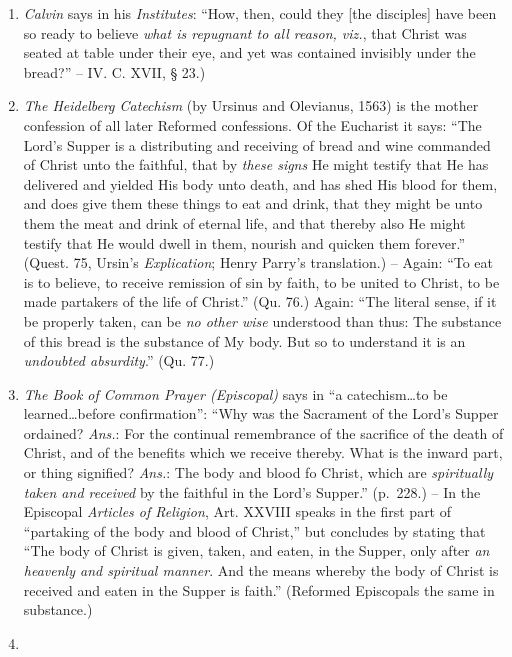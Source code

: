 \documentclass[
]{book}
\begin{document}
\begin{enumerate}
\def\labelenumi{\arabic{enumi}.}
\setcounter{enumi}{1}
\item
  \emph{Calvin} says in his \emph{Institutes}: ``How, then, could they {[}the disciples{]} have been so ready to believe \emph{what is repugnant to all reason, viz.}, that Christ was seated at table under their eye, and yet was contained invisibly under the bread?'' -- IV. C. XVII, § 23.)
\item
  \emph{The Heidelberg Catechism} (by Ursinus and Olevianus, 1563) is the mother confession of all later Reformed confessions. Of the Eucharist it says: ``The Lord's Supper is a distributing and receiving of bread and wine commanded of Christ unto the faithful, that by \emph{these signs} He might testify that He has delivered and yielded His body unto death, and has shed His blood for them, and does give them these things to eat and drink, that they might be unto them the meat and drink of eternal life, and that thereby also He might testify that He would dwell in them, nourish and quicken them forever.'' (Quest. 75, Ursin's \emph{Explication}; Henry Parry's translation.) -- Again: ``To eat is to believe, to receive remission of sin by faith, to be united to Christ, to be made partakers of the life of Christ.'' (Qu. 76.) Again: ``The literal sense, if it be properly taken, can be \emph{no other wise} understood than thus: The substance of this bread is the substance of My body. But so to understand it is an \emph{undoubted absurdity}.'' (Qu. 77.)
\item
  \emph{The Book of Common Prayer (Episcopal)} says in ``a catechism\ldots to be learned\ldots before confirmation'': ``Why was the Sacrament of the Lord's Supper ordained? \emph{Ans.}: For the continual remembrance of the sacrifice of the death of Christ, and of the benefits which we receive thereby. What is the inward part, or thing signified? \emph{Ans.}: The body and blood fo Christ, which are \emph{spiritually taken and received} by the faithful in the Lord's Supper.'' (p.~228.) -- In the Episcopal \emph{Articles of Religion}, Art. XXVIII speaks in the first part of ``partaking of the body and blood of Christ,'' but concludes by stating that ``The body of Christ is given, taken, and eaten, in the Supper, only after \emph{an heavenly and spiritual manner}. And the means whereby the body of Christ is received and eaten in the Supper is faith.'' (Reformed Episcopals the same in substance.)
\item

\end{enumerate}
\end{document}
